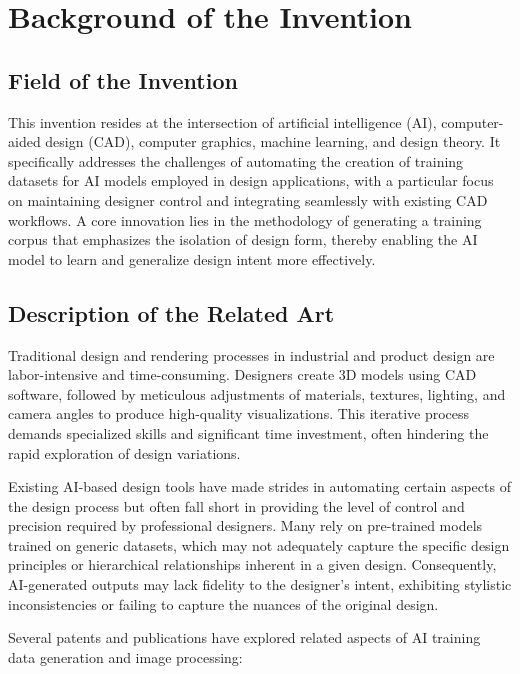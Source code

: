 \documentclass{article}
\begin{document}
\section{Background of the Invention}

\subsection{Field of the Invention}

This invention resides at the intersection of artificial intelligence (AI), computer-aided design (CAD), computer graphics, machine learning, and design theory. It specifically addresses the challenges of automating the creation of training datasets for AI models employed in design applications, with a particular focus on maintaining designer control and integrating seamlessly with existing CAD workflows. A core innovation lies in the methodology of generating a training corpus that emphasizes the isolation of design form, thereby enabling the AI model to learn and generalize design intent more effectively.

\subsection{Description of the Related Art}

Traditional design and rendering processes in industrial and product design are labor-intensive and time-consuming. Designers create 3D models using CAD software, followed by meticulous adjustments of materials, textures, lighting, and camera angles to produce high-quality visualizations. This iterative process demands specialized skills and significant time investment, often hindering the rapid exploration of design variations.

Existing AI-based design tools have made strides in automating certain aspects of the design process but often fall short in providing the level of control and precision required by professional designers. Many rely on pre-trained models trained on generic datasets, which may not adequately capture the specific design principles or hierarchical relationships inherent in a given design. Consequently, AI-generated outputs may lack fidelity to the designer's intent, exhibiting stylistic inconsistencies or failing to capture the nuances of the original design.

Several patents and publications have explored related aspects of AI training data generation and image processing:
\end{document}
